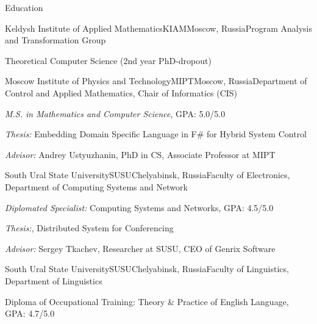 \documentclass{resume} %
\begin{document}

\begin{rSection}{Education}

\begin{rSubsectionEducation}{Keldysh Institute of Applied Mathematics}{KIAM}{Moscow, Russia}{Program Analysis and Transformation Group}
\item Theoretical Computer Science (2nd year PhD-dropout)
\end{rSubsectionEducation}


\begin{rSubsectionEducation}{Moscow Institute of Physics and Technology}{MIPT}{Moscow, Russia}{Department of Control and Applied Mathematics, Chair of Informatics (CIS)}
\item \textit{M.S. in Mathematics and Computer Science}, GPA: 5.0/5.0
\item \textit{Thesis:} Embedding Domain Specific Language in F\# for Hybrid System Control
\item \textit{Advisor:} Andrey Ustyuzhanin, PhD in CS, Associate Professor at MIPT
\end{rSubsectionEducation}


\begin{rSubsectionEducation}{South Ural State University}{SUSU}{Chelyabinsk, Russia}{Faculty of Electronics, Department of Computing Systems and Network}
\item \textit{Diplomated Specialist:} Computing Systems and Networks, GPA: 4.5/5.0
\item \textit{Thesis:}, Distributed System for Conferencing
\item \textit{Advisor:} Sergey Tkachev, Researcher at SUSU, CEO of Genrix Software
\end{rSubsectionEducation}


\begin{rSubsectionEducation}{South Ural State University}{SUSU}{Chelyabinsk, Russia}{Faculty of Linguistics, Department of Linguistics}
\item Diploma of Occupational Training: Theory \& Practice of English Language, GPA: 4.7/5.0
\end{rSubsectionEducation}


\end{rSection}
\end{document}
